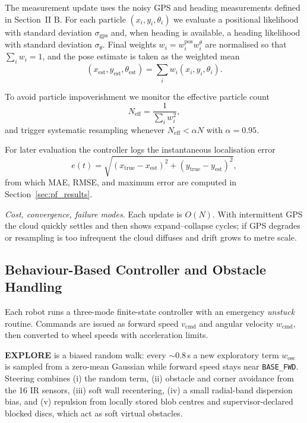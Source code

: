 \documentclass[lettersize,journal]{IEEEtran}
\begin{document}
The measurement update uses the noisy GPS and heading measurements defined in
Section~II B. For each particle $(x_i,y_i,\theta_i)$ we evaluate a positional
likelihood with standard deviation $\sigma_{\mathrm{gps}}$ and, when heading is
available, a heading likelihood with standard deviation $\sigma_\theta$. Final
weights $w_i = w_i^{\mathrm{pos}} w_i^{\theta}$ are normalised so that
$\sum_i w_i = 1$, and the pose estimate is taken as the weighted mean
\begin{equation}
(x_{\mathrm{est}},y_{\mathrm{est}},\theta_{\mathrm{est}}) =
\sum_i w_i (x_i,y_i,\theta_i).
\end{equation}

To avoid particle impoverishment we monitor the effective particle count
\begin{equation}
N_{\mathrm{eff}}=\frac{1}{\sum_i w_i^2},
\end{equation}
and trigger systematic resampling whenever $N_{\mathrm{eff}} < \alpha N$ with
$\alpha = 0.95$. 

For later evaluation the controller logs the instantaneous localisation error
\begin{equation}
e(t)=\sqrt{(x_{\mathrm{true}}-x_{\mathrm{est}})^2+
(y_{\mathrm{true}}-y_{\mathrm{est}})^2},
\label{eq:loc_error}
\end{equation}
from which MAE, RMSE, and maximum error are computed in
Section~\ref{sec:pf_results}.

\textit{Cost, convergence, failure modes.} Each update is $O(N)$. With intermittent
GPS the cloud quickly settles and then shows expand–collapse cycles; if GPS
degrades or resampling is too infrequent the cloud diffuses and drift grows to
metre scale.

\subsection{Behaviour-Based Controller and Obstacle Handling }
\label{sec:obstacle_handling}
Each robot runs a three-mode finite-state controller with an emergency
\emph{unstuck} routine. Commands are issued as forward speed
$v_{\mathrm{cmd}}$ and angular velocity $w_{\mathrm{cmd}}$, then converted to
wheel speeds with acceleration limits.

\textbf{EXPLORE} is a biased random walk:
every $\sim 0.8$\,s a new exploratory term $w_{\mathrm{osc}}$ is sampled from a
zero-mean Gaussian while forward speed stays near \texttt{BASE\_FWD}. Steering
combines (i) the random term, (ii) obstacle and corner avoidance from the 16 IR
sensors, (iii) soft wall recentering, (iv) a small radial-band dispersion bias,
and (v) repulsion from locally stored blob centres and supervisor-declared
blocked discs, which act as soft virtual obstacles.
\end{document}

